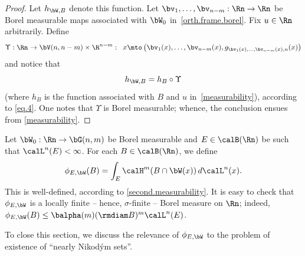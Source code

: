 \begin{proof}
Let $h_{\bW,B}$ denote this function.
Let $\bv_1,\ldots,\bv_{n-m}: \Rn \to \Rn$ be Borel measurable maps associated with $\bW_0$ in~\ref{orth.frame.borel}.
Fix $u \in \Rn$ arbitrarily.
Define
\begin{equation*}
\Upsilon: \Rn \to \bV(n,n-m) \times \R^{n-m}:\;\; x \mto \left(\bv_1(x),\ldots,\bv_{n-m}(x),g_{\bv_1(x),\ldots,\bv_{n-m}(x),u}(x) \right)
\end{equation*}
and notice that
\begin{equation*}
h_{\bW,B} = h_{B} \circ \Upsilon
\end{equation*}
(where $h_{B}$ is the function associated with $B$ and $u$ in~\ref{measurability}), according to \eqref{eq.4}.
One notes that $\Upsilon$ is Borel measurable; whence, the conclusion ensues from \ref{measurability}.
\end{proof}

\begin{Empty}
\label{def.phi}
Let $\bW_0: \Rn \to \bG(n,m)$ be Borel measurable and $E \in \calB(\Rn)$ be such that $\calL^n(E) < \infty$.
For each $B \in \calB(\Rn)$, we define
\begin{equation*}
\phi_{E,\bW}(B) = \int_E \calH^m(B \cap \bW(x)) \,d\calL^n(x).
\end{equation*}
This is well-defined, according to \ref{second.measurability}.
It is easy to check that $\phi_{E,\bW}$ is a locally finite -- hence, $\sigma$-finite -- Borel measure on $\Rn$; indeed, $\phi_{E,\bW}(B) \leq \balpha(m) (\rmdiam B)^m \calL^n(E)$.
\par
To close this section, we discuss the relevance of $\phi_{E,\bW}$ to the problem of existence of ``nearly Nikod\'ym sets''.
\end{Empty}

